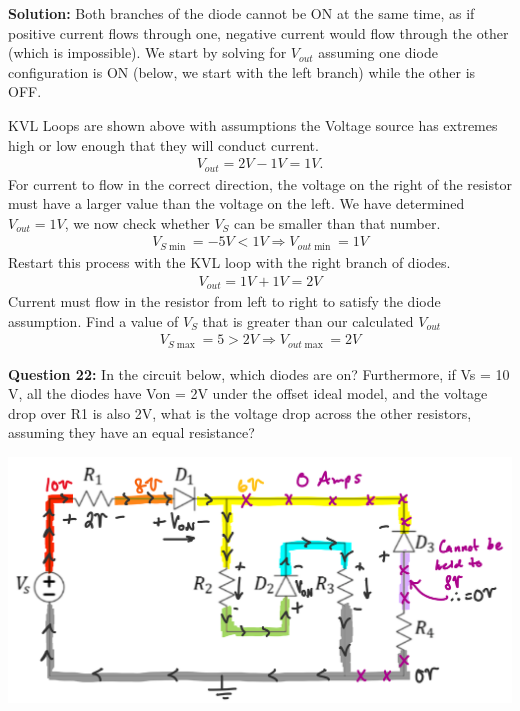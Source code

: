 \documentclass{article}
\begin{document}
\textbf{Solution:} 
Both branches of the diode cannot be ON at the same time, as if positive current flows through one, negative current would flow through the other (which is impossible). We start by solving for $V_{out}$ assuming one diode configuration is ON (below, we start with the left branch) while the other is OFF.

KVL Loops are shown above with assumptions the Voltage source has extremes high or low enough that they will conduct current.
\begin{align*}
    V_{out} = 2V-1V = 1V.
\end{align*}
\indent For current to flow in the correct direction, the voltage on the right of the resistor must have a larger value than the voltage on the left. We have determined $V_{out} = 1V$, we now check whether $V_S$ can be smaller than that number.
\begin{align*}
    V_{S\min} = -5V < 1V \Rightarrow \boxed{V_{out\min} = 1V}
\end{align*}
\indent Restart this process with the KVL loop with the right branch of diodes. 
\begin{align*}
    V_{out} = 1V+1V = 2V
\end{align*}
\indent Current must flow in the resistor from left to right to satisfy the diode assumption. Find a value of $V_S$ that is greater than our calculated $V_{out}$
\begin{align*}
    V_{S\max} = 5 > 2V \Rightarrow \boxed{V_{out\max} = 2V}
\end{align*}


\textbf{Question 22:} In the circuit below, which diodes are on? Furthermore, if Vs = 10 V, all the diodes have Von = 2V under the offset ideal model, and the voltage drop over R1 is also 2V, what is the voltage drop across the other resistors, assuming they have an equal resistance?

\begin{center}
    \includegraphics[width=0.75\linewidth]{figures/q22_sol.png}
\end{center}
\end{document}
